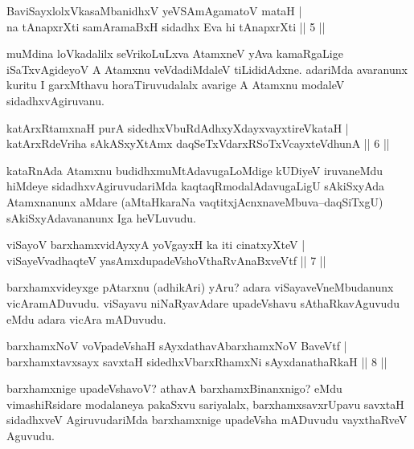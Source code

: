 
\begin{shl}
BaviSayxlolxVkasaMbanidhxV yeVSAmAgamatoV mataH |\\
na tAnapxrXti samAramaBxH sidadhx Eva hi tAnapxrXti \hfill || 5 ||
\end{shl}

\begin{artha}
muMdina loVkadalilx seVrikoLuLxva AtamxneV yAva kamaRgaLige iSaTxvAgideyoV A Atamxnu veVdadiMdaleV tiLididAdxne. adariMda avaranunx kuritu I garxMthavu horaTiruvudalalx avarige A Atamxnu modaleV sidadhxvAgiruvanu.
\end{artha}

\begin{shl}
katArxRtamxnaH purA sidedhxVbuRdAdhxyXdayxvayxtireVkataH |\\
katArxRdeVriha sAkASxyXtAmx daqSeTxVdarxRSoTxVcayxteV\s dhunA \hfill || 6 ||
\end{shl}

\begin{artha}
kataRnAda Atamxnu budidhxmuMtAdavugaLoMdige kUDiyeV iruvaneMdu hiMdeye sidadhxvAgiruvudariMda kaqtaqRmodalAdavugaLigU sAkiSxyAda Atamxnanunx aMdare (aMtaHkaraNa vaqtitxjAcnxnaveMbuva--daqSiTxgU) sAkiSxyAdavananunx Iga heVLuvudu.
\end{artha}

\begin{shl}
viSayoV barxhamxvidAyxyA yoVgayxH ka iti cinatxyXteV |\\
viSayeV\s vadhaqteV yasAmxdupadeVshoV\s thaRvAnaBxveVtf \hfill || 7 ||
\end{shl}

\begin{artha}
barxhamxvideyxge pAtarxnu (adhikAri) yAru? adara viSayaveVneMbudanunx vicAramADuvudu. viSayavu niNaRyavAdare upadeVshavu sAthaRkavAguvudu eMdu adara vicAra mADuvudu.
\end{artha}


\begin{shl}
barxhamxNoV voVpadeVshaH sAyxdathavA\s barxhamxNoV BaveVtf |\\
barxhamxtavxsayx savxtaH sidedhxVbarxRhamxNi sAyxdanathaRkaH \hfill || 8 ||
\end{shl}

\begin{artha}
barxhamxnige upadeVshavoV? athavA barxhamxBinanxnigo? eMdu vimashiRsidare modalaneya pakaSxvu sariyalalx, barxhamxsavxrUpavu savxtaH sidadhxveV AgiruvudariMda barxhamxnige upadeVsha mADuvudu vayxthaRveV Aguvudu.
\end{artha}

